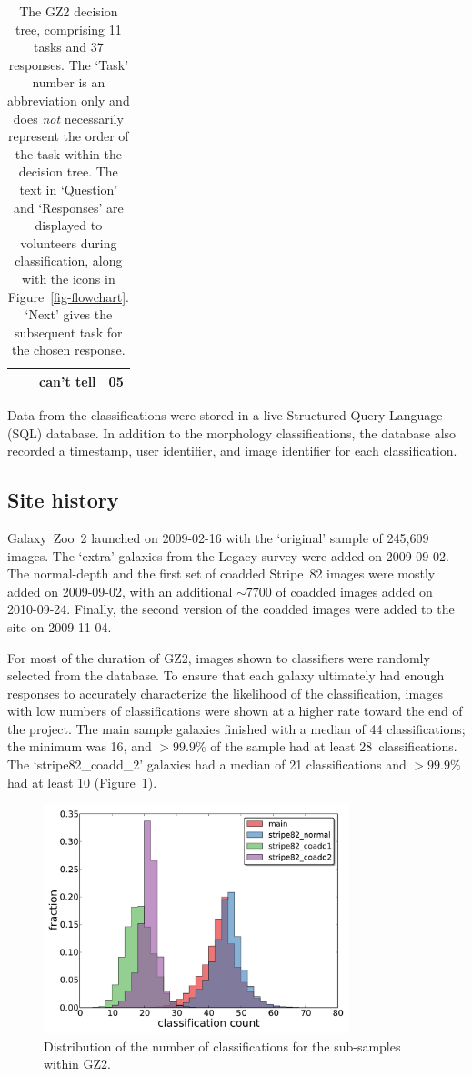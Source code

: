 \documentclass[useAMS,usenatbib]{mn2e}
\begin{document}
\begin{table}
\begin{tabular}{@{}cllr}
      & {\it                               }  & can't tell       & 05 \\
\hline
 \end{tabular}
 \caption{The GZ2 decision tree, comprising 11 tasks and 37 responses. The `Task' number is an abbreviation only and does {\em not} necessarily represent the order of the task within the decision tree. The text in `Question' and `Responses' are displayed to volunteers during classification, along with the icons in Figure~\ref{fig-flowchart}. `Next' gives the subsequent task for the chosen response. \label{tbl-tree}}
\end{table}

Data from the classifications were stored in a live Structured Query Language (SQL) database. In addition to the morphology classifications, the database also recorded a timestamp, user identifier, and image identifier for each classification. 

\subsection{Site history}\label{ssec-site_history}

Galaxy~Zoo~2 launched on 2009-02-16 with the `original' sample of 245,609 images. The `extra' galaxies from the Legacy survey were added on 2009-09-02. The normal-depth and the first set of coadded Stripe~82 images were mostly added on 2009-09-02, with an additional $\sim7700$ of coadded images added on 2010-09-24. Finally, the second version of the coadded images were added to the site on 2009-11-04. 

For most of the duration of GZ2, images shown to classifiers were randomly selected from the database. To ensure that each galaxy ultimately had enough responses to accurately characterize the likelihood of the classification, images with low numbers of classifications were shown at a higher rate toward the end of the project. The main sample galaxies finished with a median of 44 classifications; the minimum was 16, and $>99.9\%$ of the sample had at least 28~classifications. The `stripe82\_coadd\_2' galaxies had a median of 21 classifications and $>99.9\%$ had at least 10 (Figure~\ref{fig-classification_histogram}).

\begin{figure}
\includegraphics[angle=0,width=3.5in]{figures/classification_histogram.pdf}
\caption{Distribution of the number of classifications for the sub-samples within GZ2.
\label{fig-classification_histogram}}
\end{figure}
\end{document}
